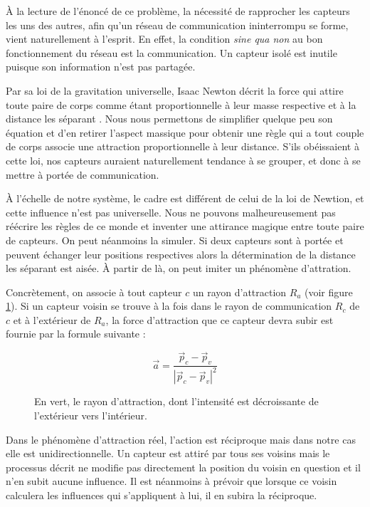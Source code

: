 \documentclass[10pt]{article}
\begin{document}
\begin{multicols}{2}
\`A la lecture de l'énoncé de ce problème, la nécessité de rapprocher
les capteurs les uns des autres, afin qu'un réseau de communication
ininterrompu se forme, vient naturellement à l'esprit. En effet, la
condition \textit{sine qua non} au bon fonctionnement du réseau est la
communication. Un capteur isolé est inutile puisque son
information n'est pas partagée.

Par sa loi de la gravitation universelle, Isaac Newton décrit la force
qui attire toute paire de corps comme étant proportionnelle à leur
masse respective et à la distance les séparant \cite{newton}. Nous
nous permettons de simplifier quelque peu son équation et d'en retirer
l'aspect massique pour obtenir une règle qui a tout couple de corps
associe une attraction proportionnelle à leur distance. S'ils
obéissaient à cette loi, nos capteurs auraient naturellement tendance
à se grouper, et donc à se mettre à portée de communication.

\`A l'échelle de notre système, le cadre est différent de celui de la
loi de Newtion, et cette influence n'est pas universelle. Nous ne
pouvons malheureusement pas réécrire les règles de ce monde et
inventer une attirance magique entre toute paire de capteurs. On peut
néanmoins la simuler. Si deux capteurs sont à portée et peuvent
échanger leur positions respectives alors la détermination de la
distance les séparant est aisée. \`A partir de là, on peut imiter un
phénomène d'attration.

Concrètement, on associe à tout capteur $c$ un rayon d'attraction
$R_a$ (voir figure \ref{attraction}). Si un capteur voisin se trouve à
la fois dans le rayon de communication $R_c$ de $c$ et à l'extérieur
de $R_a$, la force d'attraction que ce capteur devra subir est fournie
par la formule suivante :

$$
\vec{a} = \frac{\vec{p}_c - \vec{p}_v}{|\vec{p}_c - \vec{p}_v|^2}
$$

\begin{figure}[H]

  \centering

  

  \caption{En vert, le rayon d'attraction, dont l'intensité est
    décroissante de l'extérieur vers l'intérieur.}
  \label{attraction}

\end{figure}

Dans le phénomène d'attraction réel, l'action est réciproque mais dans
notre cas elle est unidirectionnelle. Un capteur est attiré par tous
ses voisins mais le processus décrit ne modifie pas directement la
position du voisin en question et il n'en subit aucune influence. Il
est néanmoins à prévoir que lorsque ce voisin calculera les influences
qui s'appliquent à lui, il en subira la réciproque.


\end{multicols}
\end{document}
